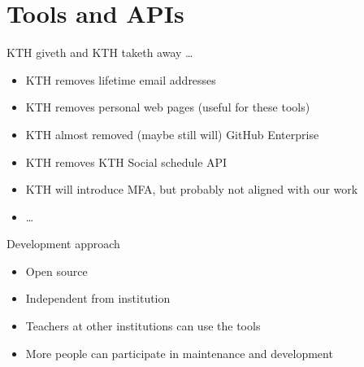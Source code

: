 \section{Tools and APIs}

\begin{frame}[fragile]
  \begin{center}
    \LARGE
    KTH giveth and KTH taketh away \dots
  \end{center}

  \begin{remark}
    \begin{itemize}
      \item KTH removes lifetime email addresses
      \item KTH removes personal web pages \alert<+>{(useful for these tools)}
      \item KTH almost removed (maybe still will) GitHub Enterprise
      \item KTH removes KTH Social schedule API
      \item \alert<+>{KTH will introduce MFA, but probably not aligned with our 
        work}
      \item \dots
    \end{itemize}
  \end{remark}
\end{frame}

\begin{frame}[fragile]
  \begin{block}{Development approach}
    \begin{itemize}
      \item Open source
      \item Independent from institution
    \end{itemize}
  \end{block}

  \pause

  \begin{example}[Advantages]
    \begin{itemize}
      \item Teachers at other institutions can use the tools
      \item More people can participate in maintenance and 
        development
    \end{itemize}
  \end{example}
\end{frame}

